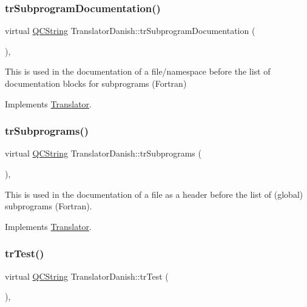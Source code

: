 \subsubsection{\texorpdfstring{trSubprogramDocumentation()}{trSubprogramDocumentation()}}
{\footnotesize\ttfamily virtual \mbox{\hyperlink{class_q_c_string}{Q\+C\+String}} Translator\+Danish\+::tr\+Subprogram\+Documentation (\begin{DoxyParamCaption}{ }\end{DoxyParamCaption})\hspace{0.3cm}{\ttfamily [inline]}, {\ttfamily [virtual]}}

This is used in the documentation of a file/namespace before the list of documentation blocks for subprograms (Fortran) 

Implements \mbox{\hyperlink{class_translator}{Translator}}.

\mbox{\label{class_translator_danish_a351a750f1abe7133a5a674e46ac9dc45}} 
\subsubsection{\texorpdfstring{trSubprograms()}{trSubprograms()}}
{\footnotesize\ttfamily virtual \mbox{\hyperlink{class_q_c_string}{Q\+C\+String}} Translator\+Danish\+::tr\+Subprograms (\begin{DoxyParamCaption}{ }\end{DoxyParamCaption})\hspace{0.3cm}{\ttfamily [inline]}, {\ttfamily [virtual]}}

This is used in the documentation of a file as a header before the list of (global) subprograms (Fortran). 

Implements \mbox{\hyperlink{class_translator}{Translator}}.

\mbox{\label{class_translator_danish_aefcdbed48a512082ad9b3990509e2f9b}} 
\subsubsection{\texorpdfstring{trTest()}{trTest()}}
{\footnotesize\ttfamily virtual \mbox{\hyperlink{class_q_c_string}{Q\+C\+String}} Translator\+Danish\+::tr\+Test (\begin{DoxyParamCaption}{ }\end{DoxyParamCaption})\hspace{0.3cm}{\ttfamily [inline]}, {\ttfamily [virtual]}}

